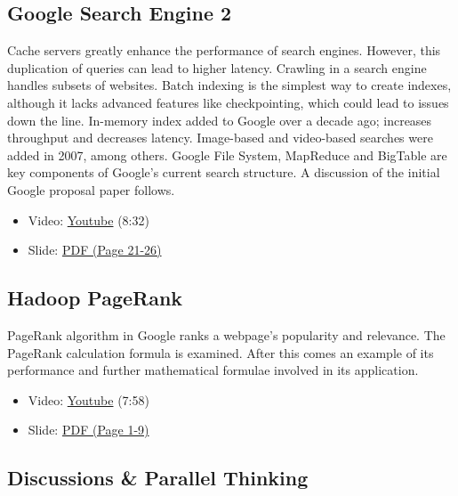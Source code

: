 \subsection{Google Search Engine 2}\label{google-search-engine-2}

Cache servers greatly enhance the performance of search engines.
However, this duplication of queries can lead to higher latency.
Crawling in a search engine handles subsets of websites. Batch indexing
is the simplest way to create indexes, although it lacks advanced
features like checkpointing, which could lead to issues down the line.
In-memory index added to Google over a decade ago; increases throughput
and decreases latency. Image-based and video-based searches were added
in 2007, among others. Google File System, MapReduce and BigTable are
key components of Google's current search structure. A discussion of the
initial Google proposal paper follows.

\begin{itemize}
\tightlist
\item
  Video: \href{https://www.youtube.com/watch?v=pxos3Yt6y6I}{Youtube}
  (8:32)
\end{itemize}

\begin{itemize}
\tightlist
\item
  Slide:
  \href{https://drive.google.com/open?id=0B88HKpainTSfYWZ0dDlrNThkVms}{PDF
  (Page 21-26)}
\end{itemize}

\subsection{Hadoop PageRank}\label{hadoop-pagerank}

PageRank algorithm in Google ranks a webpage's popularity and relevance.
The PageRank calculation formula is examined. After this comes an
example of its performance and further mathematical formulae involved in
its application.

\begin{itemize}
\tightlist
\item
  Video: \href{https://www.youtube.com/watch?v=GCp5OLLOrH0}{Youtube}
  (7:58)
\item
  Slide:
  \href{https://drive.google.com/open?id=0B88HKpainTSfWFpEZGxqSWRTYms}{PDF
  (Page 1-9)}
\end{itemize}

\subsection{Discussions \& Parallel
Thinking}\label{discussions-parallel-thinking}

